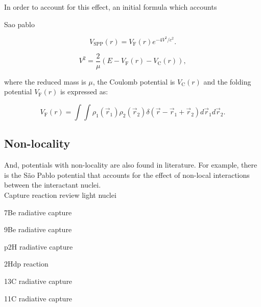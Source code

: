 \documentclass[openany]{book}
\begin{document}
In order to account for this effect, an initial formula which accounts 

Sao pablo \cite{chamon_2007}

\begin{equation} \label{eq:potential_SaoPablo}
	V_{\mathrm{SPP}} (r) = V_{\mathrm{F}} (r)e^{-4V^2/c^2}.
\end{equation}


\begin{equation} \label{eq:potential_SaoPablo_speed}
	V^2 = \frac{2}{\mu} \left( E - V_{\mathrm{F}}(r) - V_{\mathrm{C}}(r) \right),
\end{equation}

where the reduced mass is $\mu$, the Coulomb potential is $V_{\mathrm{C}}(r)$ and the folding potential  $V_{\mathrm{F}}(r)$ is expressed as:


\begin{equation} \label{eq:potential_SaoPablo_folding}
	V_{\mathrm{F}}(r) = \int \int \rho_1(\vec r_1)  \rho_2(\vec r_2) \delta(\vec r - \vec r_1 +  \vec r_2) {d\vec{r}_1}  {d\vec{r}_2}.
\end{equation}



\subsection{Non-locality}  \label{sub:potential_nonlocality}

And, potentials with non-locality are also found in literature. For example, there is the São Pablo potential that accounts for the effect of non-local interactions between the interactant nuclei. \\

Capture reaction review light nuclei\cite{ghasemi_sadeghi_2018}
\cite{dubovichenko_dzhazairov-kakhramanov_2012}

7Be radiative capture \cite{tursunov_turakulov_kadyrov_blokhintsev_2021}
\cite{bertulani_1996}

9Be radiative capture \cite{kabir_nabi_2021}

p2H radiative capture \cite{dubovichenko_dzhazairov-kakhramanov_2009}

2Hdp reaction \cite{czerski_huke_heide_ruprecht_2006}

13C radiative capture \cite{kabir_irgaziev_nabi_2020}
\cite{dubovichenko_2012}

11C radiative capture\cite{kabir_irgaziev_nabi_sagheer_2022}
\end{document}
